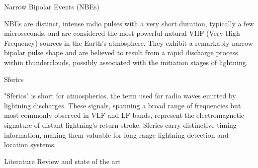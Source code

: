 \secc Narrow Bipolar Events (NBEs)

NBEs are distinct, intense radio pulses with a very short duration, typically a few microseconds, and are considered the most powerful natural VHF (Very High Frequency) sources in the Earth's atmosphere. They exhibit a remarkably narrow bipolar pulse shape and are believed to result from a rapid discharge process within thunderclouds, possibly associated with the initiation stages of lightning.

\secc Sferics

"Sferics" is short for atmospherics, the term used for radio waves emitted by lightning discharges. These signals, spanning a broad range of frequencies but most commonly observed in VLF and LF bands, represent the electromagnetic signature of distant lightning's return stroke. Sferics carry distinctive timing information, making them valuable for long range lightning detection and location systems.

\sec Literature Review and state of the art

